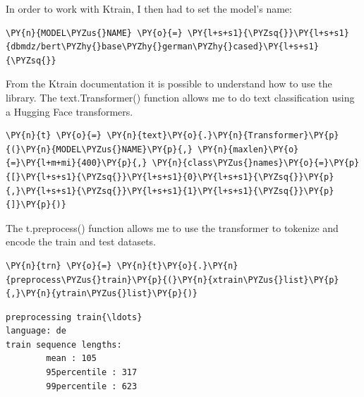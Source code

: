 In order to work with \gls{Ktrain}, I then had to set the model's name:

 \begin{tcolorbox}[breakable, size=fbox, boxrule=1pt, pad at break*=1mm,colback=cellbackground, colframe=cellborder]
\begin{Verbatim}[commandchars=\\\{\},fontsize=\footnotesize]
\PY{n}{MODEL\PYZus{}NAME} \PY{o}{=} \PY{l+s+s1}{\PYZsq{}}\PY{l+s+s1}{dbmdz/bert\PYZhy{}base\PYZhy{}german\PYZhy{}cased}\PY{l+s+s1}{\PYZsq{}}
\end{Verbatim}
\end{tcolorbox}

From the \gls{Ktrain} documentation it is possible to understand how to use the library.
The text.Transformer() function allows me to do text classification using a \gls{Hugging Face} transformers.

    \begin{tcolorbox}[breakable, size=fbox, boxrule=1pt, pad at break*=1mm,colback=cellbackground, colframe=cellborder]
\begin{Verbatim}[commandchars=\\\{\},fontsize=\footnotesize]
\PY{n}{t} \PY{o}{=} \PY{n}{text}\PY{o}{.}\PY{n}{Transformer}\PY{p}{(}\PY{n}{MODEL\PYZus{}NAME}\PY{p}{,} \PY{n}{maxlen}\PY{o}{=}\PY{l+m+mi}{400}\PY{p}{,} \PY{n}{class\PYZus{}names}\PY{o}{=}\PY{p}{[}\PY{l+s+s1}{\PYZsq{}}\PY{l+s+s1}{0}\PY{l+s+s1}{\PYZsq{}}\PY{p}{,}\PY{l+s+s1}{\PYZsq{}}\PY{l+s+s1}{1}\PY{l+s+s1}{\PYZsq{}}\PY{p}{]}\PY{p}{)}
\end{Verbatim}
\end{tcolorbox}

The t.preprocess() function allows me to use the transformer to tokenize and encode the train and test datasets.
    \begin{tcolorbox}[breakable, size=fbox, boxrule=1pt, pad at break*=1mm,colback=cellbackground, colframe=cellborder]
\begin{Verbatim}[commandchars=\\\{\},fontsize=\footnotesize]
\PY{n}{trn} \PY{o}{=} \PY{n}{t}\PY{o}{.}\PY{n}{preprocess\PYZus{}train}\PY{p}{(}\PY{n}{xtrain\PYZus{}list}\PY{p}{,}\PY{n}{ytrain\PYZus{}list}\PY{p}{)}
\end{Verbatim}
\end{tcolorbox}

    \begin{Verbatim}[commandchars=\\\{\},fontsize=\footnotesize]
preprocessing train{\ldots}
language: de
train sequence lengths:
        mean : 105
        95percentile : 317
        99percentile : 623
    \end{Verbatim}

